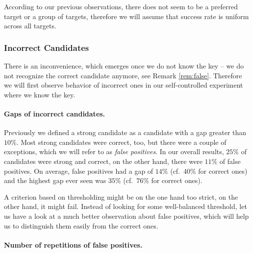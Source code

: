 	\begin{remark}
	\label{rem:uniform}
		According to our previous observations, there does not seem to be a preferred target or a group of targets, therefore we will assume that success rate is uniform across all targets.
	\end{remark}

\subsubsection{Incorrect Candidates}
	
	There is an inconvenience, which emerges once we do not know the key -- we do not recognize the correct candidate anymore, see Remark \ref{rem:false}. Therefore we will first observe behavior of incorrect ones in our self-controlled experiment where we know the key.
	
	\paragraph{Gaps of incorrect candidates.}
		
		Previously we defined a strong candidate as a candidate with a gap greater than $10\%$. Most strong candidates were correct, too, but there were a couple of exceptions, which we will refer to as {\em false positives}. In our overall results, $25\%$ of candidates were strong and correct, on the other hand, there were $11\%$ of false positives. On average, false positives had a gap of $14\%$ (cf.\ $40\%$ for correct ones) and the highest gap ever seen was $35\%$ (cf.\ $76\%$ for correct ones).
		
		A criterion based on thresholding might be on the one hand too strict, on the other hand, it might fail. Instead of looking for some well-balanced threshold, let us have a look at a much better observation about false positives, which will help us to distinguish them easily from the correct ones.
	
	\paragraph{Number of repetitions of false positives.}
		

